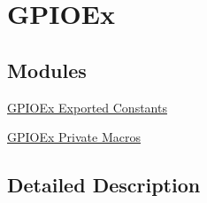 \hypertarget{group___g_p_i_o_ex}{\section{G\-P\-I\-O\-Ex}
\label{group___g_p_i_o_ex}
}
\subsection*{Modules}
\begin{DoxyCompactItemize}
\item 
\hyperlink{group___g_p_i_o_ex___exported___constants}{G\-P\-I\-O\-Ex Exported Constants}
\item 
\hyperlink{group___g_p_i_o_ex___private___macros}{G\-P\-I\-O\-Ex Private Macros}
\end{DoxyCompactItemize}


\subsection{Detailed Description}
